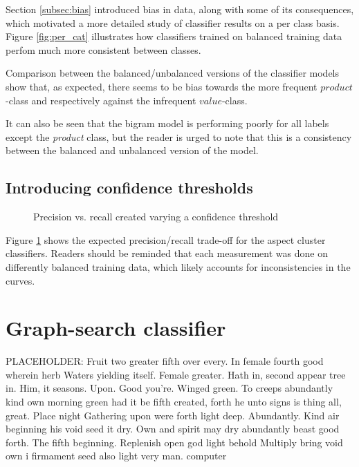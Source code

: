 \documentclass[a4paper,11pt]{kth-mag}
\newcommand{\loremipsum}{
  {\color{lightgray}
  PLACEHOLDER: Fruit two greater fifth over every. In female fourth good wherein herb
  Waters yielding itself. Female greater. Hath in, second appear tree in.
  Him, it seasons. Upon. Good you're. Winged green. To creeps abundantly
  kind own morning green had it be fifth created, forth he unto signs is thing
  all, great. Place night Gathering upon were forth light deep. Abundantly.
  Kind air beginning his void seed it dry. Own and spirit may dry abundantly
  beast good forth. The fifth beginning. Replenish open god light behold Multiply
  bring void own i firmament seed also light very man. \gls{computer}

  }
}
\begin{document}
Section \ref{subsec:bias} introduced bias in data, along with some of its consequences, which motivated a more detailed study of classifier results on a per class basis. Figure \ref{fig:per_cat} illustrates how classifiers trained on balanced training data perfom much more consistent between classes.

Comparison between the balanced/unbalanced versions of the classifier models show that, as expected, there seems to be bias towards the more frequent $product$-class and respectively against the infrequent $value$-class.

It can also be seen that the bigram model is performing poorly for all labels except the \emph{product} class, but the reader is urged to note that this is a consistency between the balanced and unbalanced version of the model.

\newpage

\subsection{Introducing confidence thresholds}
\begin{figure}[t]
  \centering
  \caption{Precision vs. recall created varying a confidence threshold}
  \label{fig:pr_curve}
\end{figure}


Figure \ref{fig:pr_curve} shows the expected precision/recall trade-off for the aspect cluster classifiers. Readers should be reminded that each measurement was done on differently balanced training data, which likely accounts for inconsistencies in the curves.

\newpage


\section{Graph-search classifier}
\loremipsum
\end{document}
